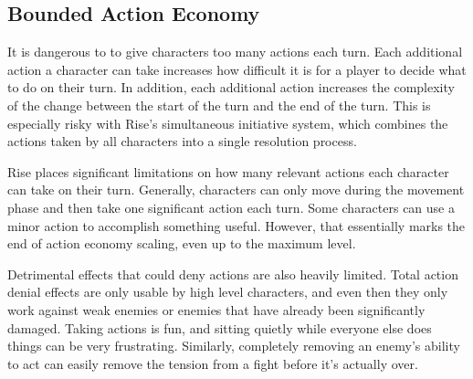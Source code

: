     \subsection{Bounded Action Economy}
        It is dangerous to to give characters too many actions each turn.
        Each additional action a character can take increases how difficult it is for a player to decide what to do on their turn.
        In addition, each additional action increases the complexity of the change between the start of the turn and the end of the turn.
        This is especially risky with Rise's simultaneous initiative system, which combines the actions taken by all characters into a single resolution process.

        Rise places significant limitations on how many relevant actions each character can take on their turn.
        Generally, characters can only move during the movement phase and then take one significant action each turn.
        Some characters can use a minor action to accomplish something useful.
        However, that essentially marks the end of action economy scaling, even up to the maximum level.

        Detrimental effects that could deny actions are also heavily limited.
        Total action denial effects are only usable by high level characters, and even then they only work against weak enemies or enemies that have already been significantly damaged.
        Taking actions is fun, and sitting quietly while everyone else does things can be very frustrating.
        Similarly, completely removing an enemy's ability to act can easily remove the tension from a fight before it's actually over.
